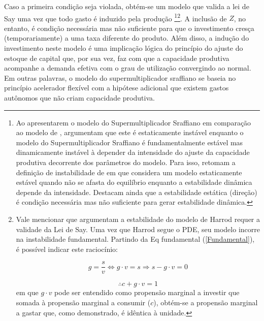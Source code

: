 Caso a primeira condição seja violada, obtém-se um modelo que valida a lei de Say uma vez que todo gasto é induzido pela produção \cite[p.~ 75]{serrano_sraffian_1995}\footnote{
	Ao apresentarem o modelo do Supermultiplicador Sraffiano em comparação ao modelo de \textcite{harrod_essay_1939}, \textcite{serrano_trouble_2017} argumentam que este é estaticamente instável enquanto o modelo do Supermultiplicador Sraffiano é fundamentalmente estável mas dinamicamente instável à depender da intensidade do ajuste da capacidade produtiva decorrente dos parâmetros do modelo.
	Para isso, retomam a definição de instabilidade de \textcite{hicks_contribution_1972} em que considera um modelo estaticamente estável quando não se afasta do equilíbrio enquanto a estabilidade dinâmica depende da intensidade. Destacam ainda que a estabilidade estática (direção) é condição necessária mas não suficiente para gerar estabilidade dinâmica.
}\footnote{
	Vale mencionar que \textcite{serrano_trouble_2017} argumentam a estabilidade do modelo de Harrod requer a validade da Lei de Say. Uma vez que Harrod segue o PDE, seu modelo incorre na instabilidade fundamental. Partindo da Eq fundamental (\ref{Fundamental}), é possível indicar este raciocínio:
	
	$$
	g = \frac{s}{v} \Leftrightarrow g\cdot v = s \Rightarrow s - g\cdot v = 0
	$$
	
	$$
	\therefore c + g\cdot v = 1
	$$
	em que $g\cdot v$ pode ser entendido como propensão marginal a investir que somada à propensão marginal a consumir ($c$), obtém-se a propensão marginal a gastar que, como demonstrado, é idêntica à unidade.
}.
A inclusão de $Z$, no entanto, é condição necessária mas não suficiente para que o investimento cresça (temporariamente) a uma taxa diferente do produto.
Além disso, a indução do investimento neste modelo é uma implicação lógica do princípio do ajuste do estoque de capital que, por sua vez, faz com que a capacidade produtiva acompanhe a demanda efetiva com o grau de utilização convergindo ao normal. 
Em outras palavras, o modelo do supermultiplicador sraffiano se baseia no princípio acelerador flexível com a hipótese adicional que existem gastos autônomos que não criam capacidade produtiva. 

